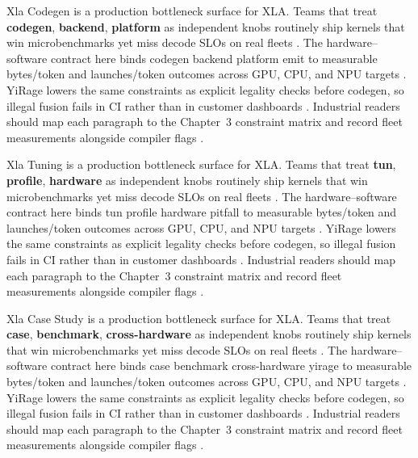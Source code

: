 Xla Codegen is a production bottleneck surface for XLA. Teams that treat \textbf{codegen}, \textbf{backend}, \textbf{platform} as independent knobs routinely ship kernels that win microbenchmarks yet miss decode SLOs on real fleets \citep{dlbook,nvidia2024cudagraphs}. The hardware--software contract here binds codegen backend platform emit to measurable bytes/token and launches/token outcomes across GPU, CPU, and NPU targets \citep{dao2022flashattention,liu2024deepseekv3}. YiRage lowers the same constraints as explicit legality checks before codegen, so illegal fusion fails in CI rather than in customer dashboards \citep{kwon2023vllm,patel2025llminference}. Industrial readers should map each paragraph to the Chapter~3 constraint matrix and record fleet measurements alongside compiler flags \citep{nvidia2024cudagraphs,taxbreak2026}.

Xla Tuning is a production bottleneck surface for XLA. Teams that treat \textbf{tun}, \textbf{profile}, \textbf{hardware} as independent knobs routinely ship kernels that win microbenchmarks yet miss decode SLOs on real fleets \citep{dao2022flashattention,liu2024deepseekv3}. The hardware--software contract here binds tun profile hardware pitfall to measurable bytes/token and launches/token outcomes across GPU, CPU, and NPU targets \citep{kwon2023vllm,patel2025llminference}. YiRage lowers the same constraints as explicit legality checks before codegen, so illegal fusion fails in CI rather than in customer dashboards \citep{nvidia2024cudagraphs,taxbreak2026}. Industrial readers should map each paragraph to the Chapter~3 constraint matrix and record fleet measurements alongside compiler flags \citep{liu2024deepseekv3,memoryfloor2026}.

Xla Case Study is a production bottleneck surface for XLA. Teams that treat \textbf{case}, \textbf{benchmark}, \textbf{cross-hardware} as independent knobs routinely ship kernels that win microbenchmarks yet miss decode SLOs on real fleets \citep{kwon2023vllm,patel2025llminference}. The hardware--software contract here binds case benchmark cross-hardware yirage to measurable bytes/token and launches/token outcomes across GPU, CPU, and NPU targets \citep{nvidia2024cudagraphs,taxbreak2026}. YiRage lowers the same constraints as explicit legality checks before codegen, so illegal fusion fails in CI rather than in customer dashboards \citep{liu2024deepseekv3,memoryfloor2026}. Industrial readers should map each paragraph to the Chapter~3 constraint matrix and record fleet measurements alongside compiler flags \citep{patel2025llminference,nvidia2022hopper}.

